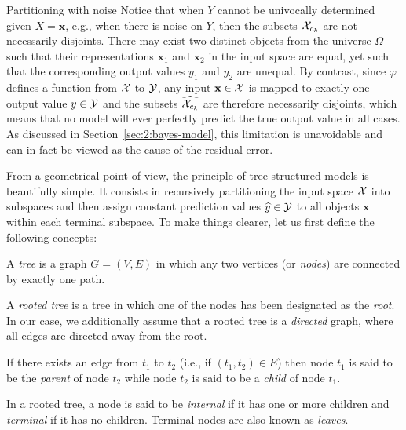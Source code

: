 \begin{remark}{Partitioning with noise}
Notice that when $Y$ cannot be univocally determined given $X=\mathbf{x}$,
e.g., when there is noise on $Y$, then the subsets ${\cal X}_{c_k}$ are not
necessarily disjoints. There may exist two distinct objects from the universe $\Omega$ such
that their representations $\mathbf{x}_1$ and $\mathbf{x}_2$ in the input space
are equal, yet such that the corresponding output values $y_1$ and $y_2$ are unequal.
By contrast, since $\varphi$ defines a function from ${\cal X}$ to ${\cal Y}$,
any input $\mathbf{x} \in {\cal X}$ is mapped to exactly one output value $y \in
{\cal Y}$ and the subsets $\widehat{{\cal X}_{c_k}}$ are therefore necessarily
disjoints, which means that no model will ever perfectly predict the true output
value in all cases. As discussed in Section~\ref{sec:2:bayes-model}, this
limitation is unavoidable and can in fact be viewed as the cause of the residual error.
\end{remark}

From a geometrical point of view, the principle of tree structured models is
beautifully simple. It consists in recursively partitioning the input space
${\cal X}$ into subspaces and then assign constant prediction values
$\widehat{y}\in{\cal Y}$ to all objects $\mathbf{x}$ within each terminal
subspace. To make things clearer, let us first define the following concepts:

\begin{definition}
A \emph{tree} is a graph $G=(V,E)$ in which any two vertices (or \emph{nodes})
are connected by exactly one path.
\end{definition}

\begin{definition}
A \emph{rooted tree} is a tree in which one of the nodes has been designated as
the \emph{root}. In our case, we additionally assume that a rooted tree is a
\emph{directed} graph, where all edges are directed away from the root.
\end{definition}

\begin{definition}
If there exists an edge from $t_1$ to $t_2$ (i.e., if $(t_1, t_2)\in E$) then
node $t_1$ is said to be the \emph{parent} of node $t_2$ while node $t_2$ is
said to be a \emph{child} of node $t_1$.
\end{definition}

\begin{definition}
In a rooted tree, a node is said to be \emph{internal} if it has one or more
children and \emph{terminal} if it has no children. Terminal nodes are also
known as \emph{leaves}.
\end{definition}

